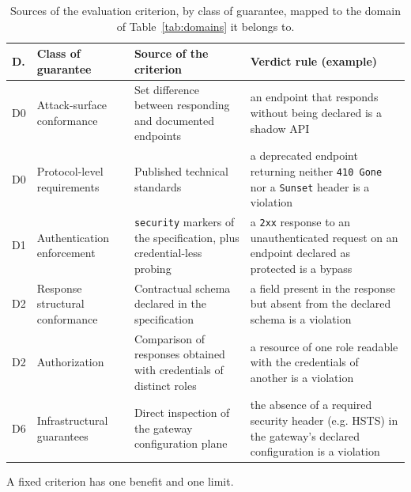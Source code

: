 \begin{table}
  \caption{Sources of the evaluation criterion, by class of guarantee, mapped to the domain of Table~\ref{tab:domains} it belongs to.}
  \label{tab:oracles}
  \begin{tabular}{p{} p{} p{} p{}}
    \toprule
    \textbf{D.} & \textbf{Class of guarantee}     & \textbf{Source of the criterion}                                             & \textbf{Verdict rule (example)}                                                                              \\
    \midrule
    D0          & Attack-surface conformance      & Set difference between responding and documented endpoints                   & an endpoint that responds without being declared is a shadow API                                             \\
    D0          & Protocol-level requirements     & Published technical standards                                                & a deprecated endpoint returning neither \texttt{410 Gone} nor a \texttt{Sunset} header is a violation        \\
    D1          & Authentication enforcement      & \texttt{security} markers of the specification, plus credential-less probing & a \texttt{2xx} response to an unauthenticated request on an endpoint declared as protected is a bypass       \\
    D2          & Response structural conformance & Contractual schema declared in the specification                             & a field present in the response but absent from the declared schema is a violation                           \\
    D2          & Authorization                   & Comparison of responses obtained with credentials of distinct roles          & a resource of one role readable with the credentials of another is a violation                               \\
    D6          & Infrastructural guarantees      & Direct inspection of the gateway configuration plane                         & the absence of a required security header (e.g. HSTS) in the gateway's declared configuration is a violation \\
    \bottomrule
  \end{tabular}
\end{table}

A fixed criterion has one benefit and one limit.

